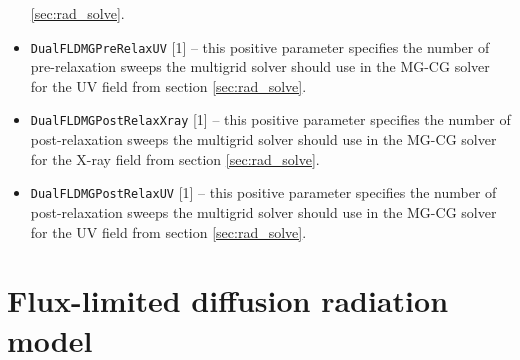 \documentclass[letterpaper,10pt]{article}
\renewcommand{\(}{\left(}
\renewcommand{\)}{\right)}
\begin{document}
\begin{itemize}
  \ref{sec:rad_solve}. 
\item {\tt DualFLDMGPreRelaxUV} [1] -- this positive parameter
  specifies the number of pre-relaxation sweeps the multigrid solver
  should use in the MG-CG solver for the UV field from section
  \ref{sec:rad_solve}. 
\item {\tt DualFLDMGPostRelaxXray} [1] -- this positive parameter
  specifies the number of post-relaxation sweeps the multigrid solver
  should use in the MG-CG solver for the X-ray field from section
  \ref{sec:rad_solve}. 
\item {\tt DualFLDMGPostRelaxUV} [1] -- this positive parameter
  specifies the number of post-relaxation sweeps the multigrid solver
  should use in the MG-CG solver for the UV field from section
  \ref{sec:rad_solve}. 
\end{itemize}




\section{Flux-limited diffusion radiation model}
\label{sec:rad_model}
\end{document}
